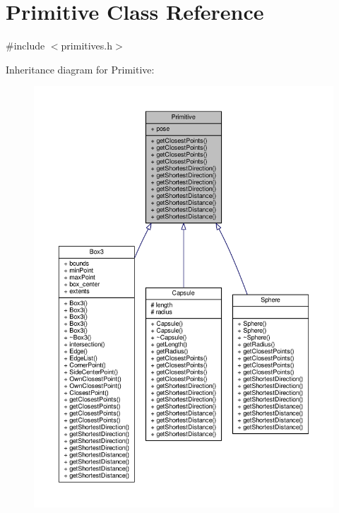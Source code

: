 \hypertarget{class_primitive}{}\section{Primitive Class Reference}
\label{class_primitive}


{\ttfamily \#include $<$primitives.\+h$>$}



Inheritance diagram for Primitive\+:
\nopagebreak
\begin{figure}[H]
\begin{center}
\leavevmode
\includegraphics[width=350pt]{class_primitive__inherit__graph}
\end{center}
\end{figure}


